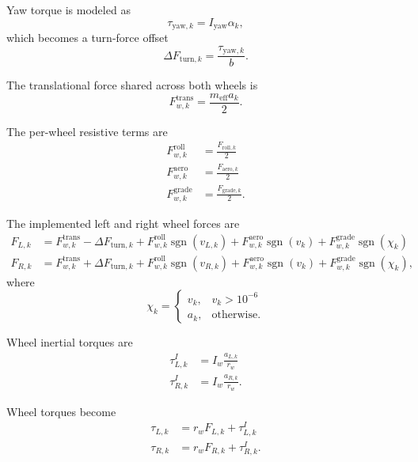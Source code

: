 \documentclass[11pt]{article}
\begin{document}
Yaw torque is modeled as
\begin{equation}
\tau_{\mathrm{yaw},k} = I_{\mathrm{yaw}} \alpha_k,
\end{equation}
which becomes a turn-force offset
\begin{equation}
\Delta F_{\mathrm{turn},k} = \frac{\tau_{\mathrm{yaw},k}}{b}.
\end{equation}

The translational force shared across both wheels is
\begin{equation}
F^{\mathrm{trans}}_{w,k} = \frac{m_{\mathrm{eff}} a_k}{2}.
\end{equation}

The per-wheel resistive terms are
\begin{align}
F^{\mathrm{roll}}_{w,k} &= \frac{F_{\mathrm{roll},k}}{2} \\
F^{\mathrm{aero}}_{w,k} &= \frac{F_{\mathrm{aero},k}}{2} \\
F^{\mathrm{grade}}_{w,k} &= \frac{F_{\mathrm{grade},k}}{2}.
\end{align}

The implemented left and right wheel forces are
\begin{align}
F_{L,k} &= F^{\mathrm{trans}}_{w,k}
          - \Delta F_{\mathrm{turn},k}
          + F^{\mathrm{roll}}_{w,k}\operatorname{sgn}(v_{L,k})
          + F^{\mathrm{aero}}_{w,k}\operatorname{sgn}(v_k)
          + F^{\mathrm{grade}}_{w,k}\operatorname{sgn}(\chi_k) \\
F_{R,k} &= F^{\mathrm{trans}}_{w,k}
          + \Delta F_{\mathrm{turn},k}
          + F^{\mathrm{roll}}_{w,k}\operatorname{sgn}(v_{R,k})
          + F^{\mathrm{aero}}_{w,k}\operatorname{sgn}(v_k)
          + F^{\mathrm{grade}}_{w,k}\operatorname{sgn}(\chi_k),
\end{align}
where
\begin{equation}
\chi_k =
\begin{cases}
v_k, & v_k > 10^{-6} \\
a_k, & \text{otherwise.}
\end{cases}
\end{equation}

Wheel inertial torques are
\begin{align}
\tau^I_{L,k} &= I_w \frac{a_{L,k}}{r_w} \\
\tau^I_{R,k} &= I_w \frac{a_{R,k}}{r_w}.
\end{align}

Wheel torques become
\begin{align}
\tau_{L,k} &= r_w F_{L,k} + \tau^I_{L,k} \\
\tau_{R,k} &= r_w F_{R,k} + \tau^I_{R,k}.
\end{align}
\end{document}

